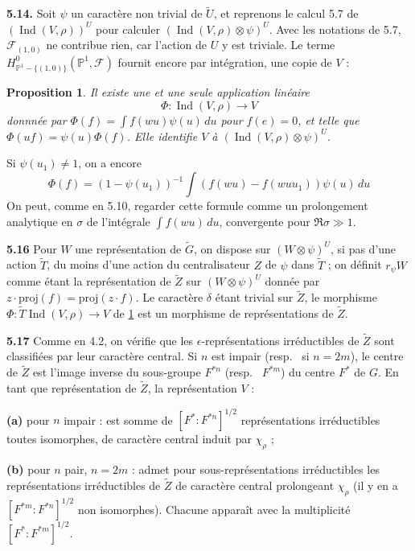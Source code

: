 \documentclass[12pt,a4paper]{article}
\theoremstyle{plain}
\newtheorem{proposition}[theorem]{Proposition}
\theoremstyle{definition}
\theoremstyle{remark}
\DeclareMathOperator{\Ind}{Ind}
\newcommand{\wt}{\widetilde}
\newcommand{\cF}{\mathscr{F}}
\newcommand{\PP}{\mathbb{P}}
\providecommand{\PP}{\mathbb{P}}
\providecommand{\cF}{\mathcal{F}}
\begin{document}
\textbf{5.14.} Soit $\psi$ un caractère non trivial de $\wt{U}$, et reprenons le calcul 5.7 de $(\Ind(V, \rho))^U$ pour calculer $(\Ind(V, \rho) \otimes \psi)^U$. Avec les notations de 5.7, $\cF_{(1,0)}$ ne contribue rien, car l'action de $U$ y est triviale. Le terme $H^0_{\PP^1 - \{(1,0)\}}(\PP^1, \cF)$ fournit encore par intégration, une copie de $V$ :

\begin{proposition}\label{prop:5.15}
Il existe une et une seule application linéaire
\[
\Phi : \Ind(V, \rho) \longrightarrow V
\]
donnnée par $\Phi(f) = \int f(wu) \psi(u) \, du$ pour $f(e) = 0$, et telle que $\Phi(uf) = \psi(u) \Phi(f)$. Elle identifie $V$ à $(\Ind(V, \rho) \otimes \psi)^U$.
\end{proposition}

Si $\psi(u_1) \neq 1$, on a encore
\begin{equation}\label{eq:5.15.1}
\Phi(f) = (1 - \psi(u_1))^{-1} \int (f(wu) - f(wuu_1)) \psi(u) \, du
\tag{5.15.1}
\end{equation}
On peut, comme en 5.10, regarder cette formule comme un prolongement analytique en $\sigma$ de l'intégrale $\int f(wu) \, du$, convergente pour $\Re \sigma \gg 1$.

\textbf{5.16} Pour $W$ une représentation de $\wt{G}$, on dispose sur $(W \otimes \psi)^U$, si pas d'une action $\wt{T}$, du moins d'une action du centralisateur $Z$ de $\psi$ dans $\wt{T}$ ; on définit $r_\psi W$ comme étant la représentation de $\wt{Z}$ sur $(W \otimes \psi)^U$ donnée par $z \cdot \mathrm{proj}(f) = \mathrm{proj}(z \cdot f)$. Le caractère $\delta$ étant trivial sur $\wt{Z}$, le morphisme $\Phi : \wt{T} \Ind(V, \rho) \to V$ de \ref{prop:5.15} est un morphisme de représentations de $\wt{Z}$.

\textbf{5.17} Comme en 4.2, on vérifie que les $\epsilon$-représentations irréductibles de $\wt{Z}$ sont classifiées par leur caractère central. Si $n$ est impair (resp.
\ si $n = 2m$), le centre de $\wt{Z}$ est l'image inverse du sous-groupe $F^{*n}$ (resp.
\ $F^{*m}$) du centre $F^*$ de $G$. En tant que représentation de $\wt{Z}$, la représentation $V$ :

\textbf{(a)} pour $n$ impair : est somme de $[F^* : F^{*n}]^{1/2}$ représentations irréductibles toutes isomorphes, de caractère central induit par $\chi_\rho$ ;

\textbf{(b)} pour $n$ pair, $n = 2m$ : admet pour sous-représentations irréductibles les représentations irréductibles de $\wt{Z}$ de caractère central prolongeant $\chi_\rho$ (il y en a $[F^{*m} : F^{*n}]^{1/2}$ non isomorphes). Chacune apparaît avec la multiplicité $[F^* : F^{*m}]^{1/2}$.
\end{document}
